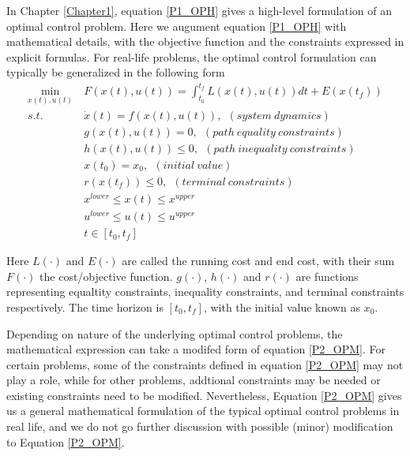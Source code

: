 \documentclass  [
  paper    = a4,
  BCOR     = 10mm,
  twoside,
  fontsize = 12pt,
  fleqn,
  toc      = bibnumbered,
  toc      = listofnumbered,
  numbers  = noendperiod,
  headings = normal,
  listof   = leveldown,
  version  = 3.03
]                                       {scrreprt}
\newcommand{\<}{\langle}
\renewcommand{\>}{\rangle}
\begin{document}
In Chapter \ref{Chapter1}, equation \ref{P1_OPH} gives a high-level formulation of an optimal control problem. Here we augument equation \ref{P1_OPH}  with mathematical details, with the objective function and the constraints expressed in explicit formulas. For real-life problems, the optimal control formulation can typically be generalized in the following form  
	\begin{subequations}
		\begin{align}
			\underset{x(t), u(t)}{\text{min}}   \ &  F(x(t), u(t))  = \int_{t_0}^{t_f}L(x(t), u(t))dt + E (x(t_f)) \label{P2_cost} \\
			s.t.\ \ &  \dot{x} (t) = f(x(t), u(t)), \ \ (system \ dynamics)   \label{P2_sd} \\
			& g(x(t), u(t)) = 0, \ \  (path\  equality\  constraints)  \label{P2_ec}\\
			& h(x(t), u(t)) \leq 0, \ \ (path\  inequality \ constraints)  \label{P2_inc}\\
			& x(t_0) = x_0, \ \ (initial \ value) \\
			& r(x(t_f)) \leq 0, \ \ (terminal \ constraints)  \label{P2_final} \\
			& x^{lower} \leq x(t) \leq x^{upper}   \label{P2_box_x} \\ 
			& u^{lower} \leq u(t) \leq u^{upper}   \label{P2_box_u} \\ 
			& t \in [t_0, t_f]
		\end{align}
		\label{P2_OPM}
	\end{subequations}  

Here $L(\cdot)$ and $E(\cdot)$ are called the running cost and end cost, with their sum $F(\cdot)$ the cost/objective function. $g(\cdot)$,  $h(\cdot)$ and $r(\cdot)$ are functions representing equaltity constraints, inequality constraints, and terminal constraints respectively. The time horizon is $[t_0, t_f]$, with the initial value known as $x_0$. 

Depending on nature of the underlying optimal control problems, the mathematical expression can take a modifed form of equation \ref{P2_OPM}. For certain problems, some of the constraints defined in equation \ref{P2_OPM} may not play a role, while for other problems, addtional constraints may be needed or existing constraints need to be modified. Nevertheless, Equation \ref{P2_OPM} gives us a general mathematical formulation of the typical optimal control problems in real life, and we do not go further discussion with possible (minor) modification to Equation \ref{P2_OPM}. 
\end{document}
